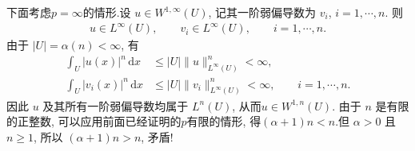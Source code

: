 \documentclass[../../main.tex]{subfiles}
\begin{document}
\begin{solution}
下面考虑$p=\infty$的情形.设 $u\in W^{1,\infty}(U)$, 记其一阶弱偏导数为 $v_i$, $i=1,\cdots,n$. 则
\begin{align*}
u\in L^\infty(U),\qquad
v_i\in L^\infty(U),
\qquad i=1,\cdots,n.
\end{align*}
由于 $|U|=\alpha(n)<\infty$, 有
\begin{align*}
\int_U|u(x)|^n\,\mathrm{d}x
&\leqslant |U|\|u\|_{L^\infty(U)}^n<\infty,\\
\int_U|v_i(x)|^n\,\mathrm{d}x
&\leqslant |U|\|v_i\|_{L^\infty(U)}^n<\infty,
\qquad i=1,\cdots,n.
\end{align*}
因此 $u$ 及其所有一阶弱偏导数均属于 $L^n(U)$, 从而$u\in W^{1,n}(U).$
由于 $n$ 是有限的正整数, 可以应用前面已经证明的$p$有限的情形, 得$(\alpha+1)n<n.$但 $\alpha>0$ 且 $n\geqslant1$, 所以 $(\alpha+1)n>n$, 矛盾! 
\end{solution}
\end{document}
